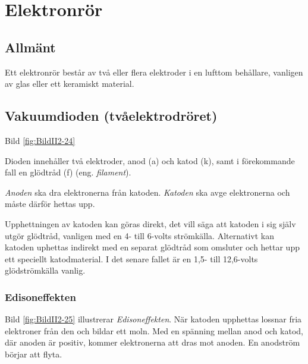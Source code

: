 \section{Elektronrör}
\label{elektronrör}

\subsection{Allmänt}

Ett elektronrör består av två eller flera elektroder i en lufttom behållare,
vanligen av glas eller ett keramiskt material.

\subsection{Vakuumdioden (tvåelektrodröret)}
\label{vakuumdioden}


Bild \ref{fig:BildII2-24}

Dioden innehåller två elektroder, anod (a) och katod (k), samt i förekommande
fall en glödtråd (f) (eng. \emph{filament}).

\emph{Anoden} ska dra elektronerna från katoden.
\emph{Katoden} ska avge elektronerna och måste därför hettas upp.

Upphettningen av katoden kan göras direkt, det vill säga att katoden i sig
själv utgör glödtråd, vanligen med en 4- till 6-volts strömkälla.
Alternativt kan katoden uphettas indirekt med en separat glödtråd som omsluter
och hettar upp ett speciellt katodmaterial.
I det senare fallet är en 1,5- till 12,6-volts glödströmkälla vanlig.

\subsubsection{Edisoneffekten}


Bild \ref{fig:BildII2-25} illustrerar \emph{Edisoneffekten}.
När katoden upphettas lossnar fria elektroner från den och bildar ett moln.
Med en spänning mellan anod och katod, där anoden är positiv, kommer
elektronerna att dras mot anoden.
En anodström börjar att flyta.

